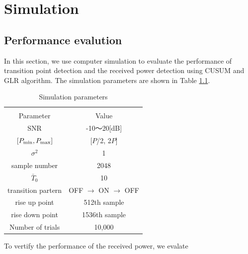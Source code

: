 \chapter[Simulation]{Simulation}
\label{chapter:Result}



\section{Performance evalution}
In this section, we use computer simulation to evaluate the performance of transition point detection and the received power detection using CUSUM and GLR algorithm. The simulation parameters are shown in Table \ref{parameter}.

\begin{table}[!htp]
\begin{center}
 \caption{\normalsize{Simulation parameters}}
 
\normalsize

  \begin{tabular}{c|c}
    & \\
    Parameter &Value \\ \hline
    SNR & -10〜20[dB] \\
    $[P_{{\rm min}},P_{{\rm max}}]$ & [$P$/2, 2$P$] \\
    $\sigma^2$ & 1 \\
    sample number & 2048 \\
    $\bar{T}_0$ & 10 \\
    transition partern & OFF $\rightarrow$ ON $\rightarrow$ OFF \\
    rise up point & 512th sample\\
    rise down point & 1536th sample\\
    Number of trials & 10,000 \\ \hline
  \end{tabular}
\label{parameter}
\end{center}
\end{table}

To vertify the performance of the received power, we evalate

